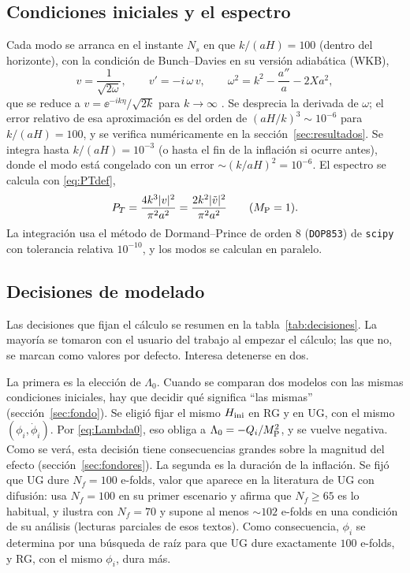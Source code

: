 \subsection{Condiciones iniciales y el espectro}

Cada modo se arranca en el instante $N_s$ en que $k/(aH)=100$ (dentro del horizonte), con la condición de Bunch--Davies en su versión adiabática (WKB),
\begin{equation}
v=\frac{1}{\sqrt{2\omega}},\qquad v'=-i\,\omega\,v,\qquad \omega^2=k^2-\frac{a''}{a}-2Xa^2,
\label{eq:BDwkb}
\end{equation}
que se reduce a $v=\ee^{-ik\eta}/\sqrt{2k}$ para $k\to\infty$ . Se desprecia la derivada de $\omega$; el error relativo de esa aproximación es del orden de $(aH/k)^3\sim10^{-6}$ para $k/(aH)=100$, y se verifica numéricamente en la sección~\ref{sec:resultados}. Se integra hasta $k/(aH)=10^{-3}$ (o hasta el fin de la inflación si ocurre antes), donde el modo está congelado con un error $\sim(k/aH)^2=10^{-6}$. El espectro se calcula con \eqref{eq:PTdef},
\begin{equation}
P_T=\frac{4k^3|v|^2}{\pi^2a^2}=\frac{2k^2|\tilde v|^2}{\pi^2a^2}\qquad(M_{\rm P}=1).
\label{eq:PTcode}
\end{equation}
La integración usa el método de Dormand--Prince de orden 8 (\texttt{DOP853}) de \texttt{scipy} con tolerancia relativa $10^{-10}$, y los modos se calculan en paralelo.

\subsection{Decisiones de modelado}
\label{sec:decisiones}

Las decisiones que fijan el cálculo se resumen en la tabla~\ref{tab:decisiones}. La mayoría se tomaron con el usuario del trabajo al empezar el cálculo; las que no, se marcan como valores por defecto. Interesa detenerse en dos.

La primera es la elección de $\Lambda_0$. Cuando se comparan dos modelos con las mismas condiciones iniciales, hay que decidir qué significa ``las mismas'' (sección~\ref{sec:fondo}). Se eligió fijar el mismo $H_{\rm ini}$ en RG y en UG, con el mismo $(\phi_i,\dot\phi_i)$. Por \eqref{eq:Lambda0}, eso obliga a $\Lambda_0=-Q_i/M_{\rm P}^2$, y se vuelve negativa. Como se verá, esta decisión tiene consecuencias grandes sobre la magnitud del efecto (sección~\ref{sec:fondores}). La segunda es la duración de la inflación. Se fijó que UG dure $N_f=100$ e-folds, valor que aparece en la literatura de UG con difusión: \cite{piccirilli23} usa $N_f=100$ en su primer escenario y afirma que $N_f\ge65$ es lo habitual, y \cite{leon22} ilustra con $N_f=70$ y supone al menos $\sim102$ e-folds en una condición de su análisis (lecturas parciales de esos textos). Como consecuencia, $\phi_i$ se determina por una búsqueda de raíz para que UG dure exactamente $100$ e-folds, y RG, con el mismo $\phi_i$, dura más.

